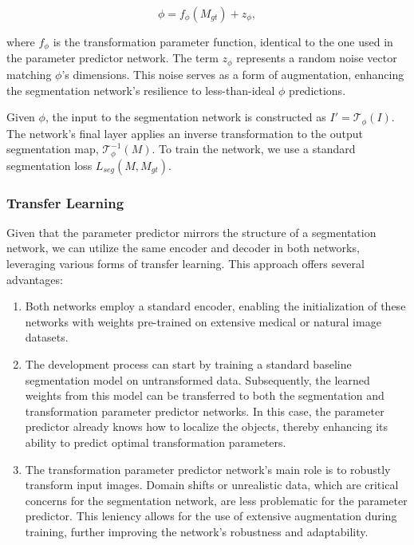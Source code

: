 \begin{equation}
	\phi = f_\phi(M_{gt}) + z_\phi,
\end{equation}

where \(f_\phi\) is the transformation parameter function, identical to the one used in the parameter predictor network. The term \(z_\phi\) represents a random noise vector matching \(\phi\)'s dimensions. This noise serves as a form of augmentation, enhancing the segmentation network's resilience to less-than-ideal \(\phi\) predictions.

Given $\phi$, the input to the segmentation network is constructed as $I' = \mathcal{T}_\phi(I)$. The network's final layer applies an inverse transformation to the output segmentation map, \(\mathcal{T}^{-1}_\phi(M)\). To train the network, we use a standard segmentation loss $L_{seg}(M, M_{gt})$.

\subsubsection{Transfer Learning}

Given that the parameter predictor mirrors the structure of a segmentation network, we can utilize the same encoder and decoder in both networks, leveraging various forms of transfer learning. This approach offers several advantages:

\begin{enumerate}
	\item Both networks employ a standard encoder, enabling the initialization of these networks with weights pre-trained on extensive medical or natural image datasets.
	\item The development process can start by training a standard baseline segmentation model on untransformed data. Subsequently, the learned weights from this model can be transferred to both the segmentation and transformation parameter predictor networks. In this case, the parameter predictor already knows how to localize the objects, thereby enhancing its ability to predict optimal transformation parameters.
	\item The transformation parameter predictor network's main role is to robustly transform input images. Domain shifts or unrealistic data, which are critical concerns for the segmentation network, are less problematic for the parameter predictor. This leniency allows for the use of extensive augmentation during training, further improving the network's robustness and adaptability.
\end{enumerate}

